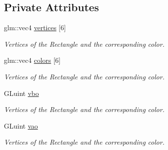 \subsection*{Private Attributes}
{\bf }\par
\begin{DoxyCompactItemize}
\item 
glm\+::vec4 \hyperlink{classcft_1_1Palette_adbbd989d29cd5cb118fa26af1630fe97}{vertices} \mbox{[}6\mbox{]}\hypertarget{classcft_1_1Palette_adbbd989d29cd5cb118fa26af1630fe97}{}\label{classcft_1_1Palette_adbbd989d29cd5cb118fa26af1630fe97}

\begin{DoxyCompactList}\small\item\em Vertices of the Rectangle and the corresponding color. \end{DoxyCompactList}\item 
glm\+::vec4 \hyperlink{classcft_1_1Palette_ac7d6e318cfc1797de00fa8e1a6f53951}{colors} \mbox{[}6\mbox{]}\hypertarget{classcft_1_1Palette_ac7d6e318cfc1797de00fa8e1a6f53951}{}\label{classcft_1_1Palette_ac7d6e318cfc1797de00fa8e1a6f53951}

\begin{DoxyCompactList}\small\item\em Vertices of the Rectangle and the corresponding color. \end{DoxyCompactList}\item 
G\+Luint \hyperlink{classcft_1_1Palette_a447d9c12f33c299c7880eac807249c12}{vbo}\hypertarget{classcft_1_1Palette_a447d9c12f33c299c7880eac807249c12}{}\label{classcft_1_1Palette_a447d9c12f33c299c7880eac807249c12}

\begin{DoxyCompactList}\small\item\em Vertices of the Rectangle and the corresponding color. \end{DoxyCompactList}\item 
G\+Luint \hyperlink{classcft_1_1Palette_a8cca4a7b356941465e8ab8fb38af5b81}{vao}\hypertarget{classcft_1_1Palette_a8cca4a7b356941465e8ab8fb38af5b81}{}\label{classcft_1_1Palette_a8cca4a7b356941465e8ab8fb38af5b81}

\begin{DoxyCompactList}\small\item\em Vertices of the Rectangle and the corresponding color. \end{DoxyCompactList}\end{DoxyCompactItemize}


